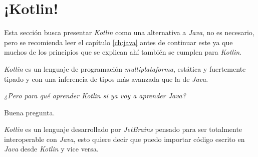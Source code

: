\chapter{¡Kotlin!}
  Esta sección busca presentar \textit{Kotlin} como una alternativa a \textit{Java}, no es
  necesario, pero se recomienda leer el capítulo \ref{ch:java} antes de continuar este ya que
  muchos de los principios que se explican ahí también se cumplen para \textit{Kotlin}.

  \textit{Kotlin} es un lenguaje de programación \textit{multiplataforma}, estática y fuertemente
  tipado y con una inferencia de tipos más avanzada que la de \textit{Java}.

  \begin{center}
    \textit{¿Pero para qué aprender Kotlin si ya voy a aprender Java?}
  \end{center}

  Buena pregunta.
  \vfill

  \textit{Kotlin} es un lenguaje desarrollado por \textit{JetBrains} pensado para ser totalmente 
  interoperable con \textit{Java}, esto quiere decir que puedo importar código escrito en 
  \textit{Java} desde \textit{Kotlin} y vice versa.
